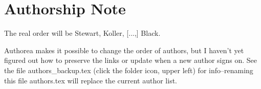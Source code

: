 \section{Authorship Note}
The real order will be Stewart, Koller, [...,] Black.

Authorea makes it possible to change the order of authors, but I haven't yet figured out how to preserve the links or update when a new author signs on. See the file authors_backup.tex (click the folder icon, upper left) for info--renaming this file authors.tex will replace the current author list.